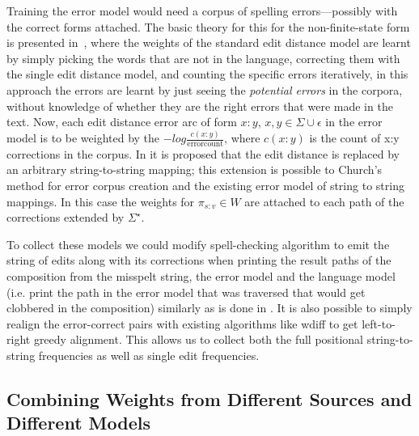 \documentclass[a4paper,12pt]{article}
\begin{document}
Training the error model would need a corpus of spelling
errors---possibly with the correct forms attached. The basic theory for this
for the non-finite-state form is presented in~\cite{church1991probability},
where the weights of the standard edit distance model are learnt by simply
picking the words that are not in the language, correcting them with the single
edit distance model, and counting the specific errors iteratively, in this
approach the errors are learnt by just seeing the \emph{potential errors} in
the corpora, without knowledge of whether they are the right errors that were
made in the text.  Now, each edit distance error arc of form $x:y$, $x, y \in
\Sigma \cup {\epsilon}$ in the error model is to be weighted by the $-log
\frac{c(x:y)}{\mathrm{error count}}$, where $c(x:y)$ is the count of x:y
corrections in the corpus. In \cite{brill2000improved} it is proposed that the
edit distance is replaced by an arbitrary string-to-string mapping; this
extension is possible to Church's method for error corpus creation and
the existing error model of string to string mappings. In this case the
weights for $\pi_{s:v} \in W$ are attached to each path of the corrections
extended by $\Sigma^{\star}$. 

To collect these models we could modify spell-checking algorithm to emit the
string of edits along with its corrections when printing the result paths of
the composition from the misspelt string, the error model and the language
model (i.e. print the path in the error model that was traversed that would get
clobbered in the composition) similarly as is done in
\cite{ristad1998learning}. It is also possible to simply realign the
error-correct pairs with existing algorithms like wdiff to get left-to-right
greedy alignment. This allows us to collect both the full positional
string-to-string frequencies as well as single edit frequencies.

\subsection{Combining Weights from Different Sources and Different Models}
\label{subsec:combining-weights}
\end{document}
